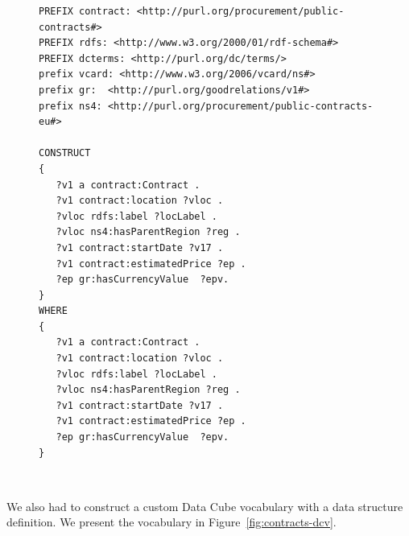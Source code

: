 \begin{figure}
  \scriptsize
  \begin{verbatim}
PREFIX contract: <http://purl.org/procurement/public-contracts#>
PREFIX rdfs: <http://www.w3.org/2000/01/rdf-schema#>
PREFIX dcterms: <http://purl.org/dc/terms/>
prefix vcard: <http://www.w3.org/2006/vcard/ns#> 
prefix gr:	<http://purl.org/goodrelations/v1#> 
prefix ns4:	<http://purl.org/procurement/public-contracts-eu#>

CONSTRUCT 
{
   ?v1 a contract:Contract .
   ?v1 contract:location ?vloc .
   ?vloc rdfs:label ?locLabel .
   ?vloc ns4:hasParentRegion ?reg .
   ?v1 contract:startDate ?v17 .
   ?v1 contract:estimatedPrice ?ep .
   ?ep gr:hasCurrencyValue	?epv.
}
WHERE
{
   ?v1 a contract:Contract .
   ?v1 contract:location ?vloc .
   ?vloc rdfs:label ?locLabel .
   ?vloc ns4:hasParentRegion ?reg .
   ?v1 contract:startDate ?v17 .
   ?v1 contract:estimatedPrice ?ep .
   ?ep gr:hasCurrencyValue	?epv.
}
  \end{verbatim}
  \label{fig:contracts-query}
  \
\end{figure}

We also had to construct a custom Data Cube vocabulary with a data structure 
definition. We present the vocabulary in Figure~\ref{fig:contracts-dcv}.

